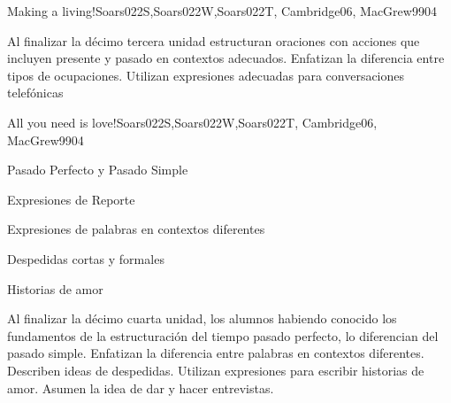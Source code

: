 \begin{syllabus}
\begin{unit}{Making a living!}{Soars022S,Soars022W,Soars022T, Cambridge06, MacGrew99}{0}{4}
   \begin{unitgoals}
      \item Al finalizar la décimo tercera unidad estructuran oraciones con acciones que incluyen presente y pasado en contextos adecuados. Enfatizan la diferencia entre tipos de ocupaciones. Utilizan expresiones adecuadas para conversaciones telefónicas
   \end{unitgoals}
\end{unit}

\begin{unit}{All you need is love!}{Soars022S,Soars022W,Soars022T, Cambridge06, MacGrew99}{0}{4}
   \begin{topics}
      \item Pasado Perfecto y Pasado Simple
      \item Expresiones de Reporte
      \item Expresiones de palabras en contextos diferentes 
      \item Despedidas cortas y formales 
      \item Historias de amor
   \end{topics}

   \begin{unitgoals}
      \item Al finalizar la décimo cuarta unidad, los alumnos habiendo conocido los fundamentos de la estructuración del tiempo pasado perfecto, lo diferencian del pasado simple. Enfatizan la diferencia entre palabras en contextos diferentes. Describen ideas de despedidas. Utilizan expresiones para escribir historias de amor. Asumen la idea de dar y hacer entrevistas.
   \end{unitgoals}
\end{unit}



\begin{coursebibliography}
\end{coursebibliography}

\end{syllabus}
%
